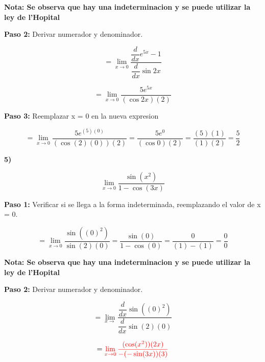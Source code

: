 \documentclass[12pt,a4paper]{article}
\begin{document}
\vspace{0.2cm}

\textbf{Nota: Se observa que hay una indeterminacion y se puede utilizar la ley de l'Hopital }

\vspace{0.5cm}

\textbf{Paso 2:}
\vspace{0.2cm}
Derivar numerador y denominador.

\[
= \lim_{x \to 0} \frac{\dfrac{d}{dx} e^{5x} -1}{\dfrac{d}{dx} \sin 2x}
\]

\[
= \lim_{x \to 0} \frac{5e^{5x}}{(\cos 2x)(2)}
\]

\vspace{0.2cm}



\textbf{Paso 3:}
\vspace{0.2cm}
Reemplazar x = 0 en la nueva expresion

\[
= \lim_{x \to 0} \frac{5e^{(5)(0)}}{(\cos (2)(0))(2)}= \frac{5e^{0}}{(\cos 0)(2)}= \frac{(5)(1)}{(1)(2)}= \frac{5}{2}
\]


\newpage

\textbf{5)}

\[
\lim_{x \to 0} \frac{\sin(x^2)}{1- \cos (3x)} 
\]


\vspace{0.2cm}

\textbf{Paso 1:}
\vspace{0.2cm}
Verificar si se llega a la forma indeterminada, reemplazando el valor de x = 0.

\[
= \lim_{x \to 0} \frac{\sin ((0)^2)}{\sin (2)(0)}=  \frac{\sin(0)}{1-\cos(0)} =  \frac{0}{(1)-(1)} = \frac{0}{0}
\]

\vspace{0.2cm}

\textbf{Nota: Se observa que hay una indeterminacion y se puede utilizar la ley de l'Hopital }

\vspace{0.5cm}

\textbf{Paso 2:}
\vspace{0.2cm}
Derivar numerador y denominador.

\[
= \lim_{x \to } \frac{\dfrac{d}{dx} \sin ((0)^2)}{\dfrac{d}{dx} \sin (2)(0)}
\]

\[
= \textcolor{red}{\lim_{x \to 0} \frac{(\cos (x^2))(2x)}{-(-\sin(3x))(3)}}
\]

\vspace{0.2cm}
\end{document}
